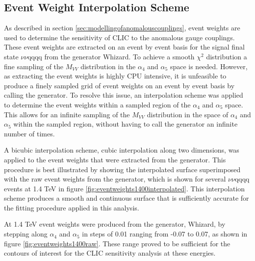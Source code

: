 
\subsection{Event Weight Interpolation Scheme}
\label{sec:eventweightsinterpolation}
As described in section \ref{sec:modellingofanomalouscouplings}, event weights are used to determine the sensitivity of CLIC to the anomalous gauge couplings.  These event weights are extracted on an event by event basis for the signal final state $\nu\nu\text{qqqq}$ from the generator Whizard.  To achieve a smooth $\chi^{2}$ distribution a fine sampling of the $M_{VV}$ distribution in the $\alpha_{4}$ and $\alpha_{5}$ space is needed.  However, as extracting the event weights is highly CPU intensive, it is unfeasible to produce a finely sampled grid of event weights on an event by event basis by calling the generator.  To resolve this issue, an interpolation scheme was applied to determine the event weights within a sampled region of the $\alpha_{4}$ and $\alpha_{5}$ space.  This allows for an infinite sampling of the $M_{VV}$ distribution in the space of $\alpha_{4}$ and $\alpha_{5}$ within the sampled region, without having to call the generator an infinite number of times.

A bicubic interpolation scheme, cubic interpolation along two dimensions, was applied to the event weights that were extracted from the generator.  This procedure is best illustrated by showing the interpolated surface superimposed with the raw event weights from the generator, which is shown for several $\nu\nu\text{qqqq}$ events at 1.4 TeV in figure \ref{fig:eventweights1400interpolated}.  This interpolation scheme produces a smooth and continuous surface that is sufficiently accurate for the fitting procedure applied in this analysis.  

At 1.4 TeV event weights were produced from the generator, Whizard, by stepping along $\alpha_{4}$ and $\alpha_{5}$ in steps of 0.01 ranging from -0.07 to 0.07, as shown in figure \ref{fig:eventweights1400raw}.  These range proved to be sufficient for the contours of interest for the CLIC sensitivity analysis at these energies.

